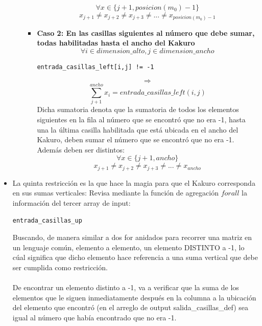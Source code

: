 \documentclass[12pt]{article}
\begin{document}
\begin{itemize}
\begin{itemize}
\begin{itemize}
\begin{equation*}
\forall x \in \{j+1,posicion(m_0)-1\}
\end{equation*}
\begin{equation*}
x_{j+1} \neq x_{j+2} \neq x_{j+3} \neq ... \neq x_{posicion(m_0)-1}
\end{equation*}
\item \textbf{Caso 2: En las casillas siguientes al número que debe sumar, todas habilitadas hasta el ancho del Kakuro}
\begin{equation*}
\forall i \in dimension\_alto, j \in dimension\_ancho
\end{equation*}
\begin{verbatim}
entrada_casillas_left[i,j] != -1
\end{verbatim}
\begin{equation*}
\Rightarrow
\end{equation*}
\begin{equation*}
\sum_{j+1}^{ancho} x_{i} = entrada\_casillas\_left(i,j)
\end{equation*}
Dicha sumatoria denota que la sumatoria de todos los elementos siguientes en la fila al número que se encontró que no era -1, hasta una la última casilla habilitada que está ubicada en el ancho del Kakuro, deben sumar el número que se encontró que no era -1. Además deben ser distintos:
\begin{equation*}
\forall x \in \{j+1,ancho\}
\end{equation*}
\begin{equation*}
x_{j+1} \neq x_{j+2} \neq x_{j+3} \neq ... \neq x_{ancho}
\end{equation*}
\end{itemize}
\end{itemize}
\item La quinta restricción es la que hace la magia para que el Kakuro corresponda en sus sumas verticales: Revisa mediante la función de agregación $forall$ la información del tercer array de input: 
\begin{verbatim}
entrada_casillas_up 
\end{verbatim}
Buscando, de manera similar a dos for anidados para recorrer una matriz en un lenguaje común, elemento a elemento, un elemento DISTINTO a -1, lo cúal significa que dicho elemento hace referencia a una suma vertical que debe ser cumplida como restricción. \\ \\ 
De encontrar un elemento distinto a -1, va a verificar que la suma de los elementos que le siguen inmediatamente después en la columna a la ubicación del elemento que encontró (en el arreglo de output salida\_casillas\_def) sea igual al número que había encontrado que no era -1. 

\end{itemize}
\end{document}
